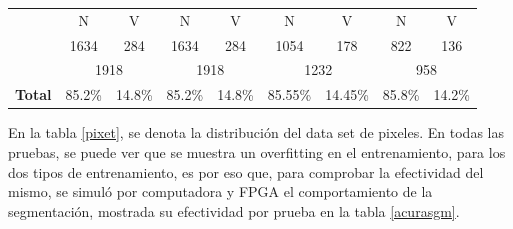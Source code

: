 \documentclass[twoside,spanish,ESP,MSc]{plantillaLabUPV}
\theoremstyle{definition}
\begin{document}
\begin{table}[h]
\begin{tabular}{|c|c|c|c|c|c|c|c|c|}
		& {\color[HTML]{F56B00} N} & {\color[HTML]{009901} V} & {\color[HTML]{F56B00} N} & {\color[HTML]{009901} V} & {\color[HTML]{F56B00} N} & {\color[HTML]{009901} V} & {\color[HTML]{F56B00} N} & {\color[HTML]{009901} V} \\ \cline{2-9} 
		& 1634                     & 284                      & 1634                     & 284                      & 1054                        & 178                        & 822                        & 136                        \\
		\cline{2-9} 
		& \multicolumn{2}{c|}{1918}                           & \multicolumn{2}{c|}{1918}                           & \multicolumn{2}{c|}{1232}                           & \multicolumn{2}{c|}{958}                           \\ \cline{2-9} 
		\multirow{-4}{*}{\textbf{Total}} & 85.2\%                   & 14.8\%                   & 85.2\%                   & 14.8\%                   & 85.55\%                      & 14.45\%                      & 85.8\%                      & 14.2\%                      \\ \hline

	\end{tabular}
\end{table}


En la tabla \ref{pixet}, se denota la distribución del data set de pixeles. En todas las pruebas, se puede ver que se muestra un overfitting en el entrenamiento, para los dos tipos de entrenamiento, es por eso que, para comprobar la efectividad del mismo, se simuló por computadora y FPGA el comportamiento de la segmentación, mostrada su efectividad por prueba en la tabla \ref{acurasgm}.
\end{document}
